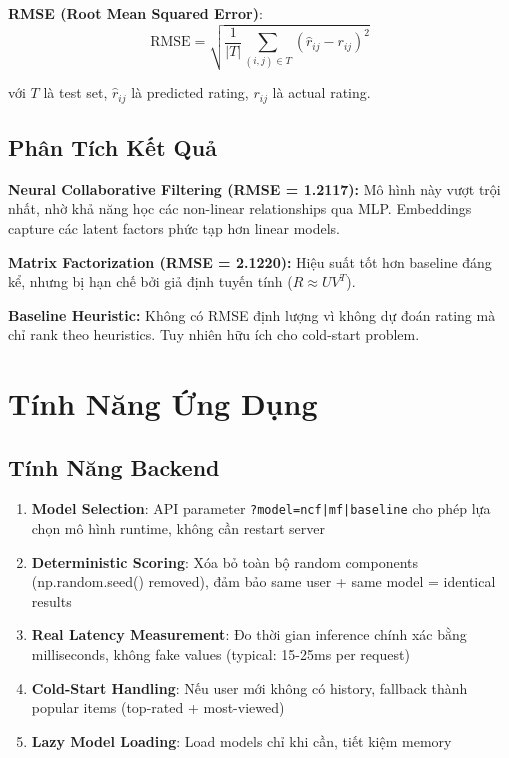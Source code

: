 \documentclass[12pt,a4paper]{article}
\begin{document}
\textbf{RMSE (Root Mean Squared Error)}:
\begin{equation}
\text{RMSE} = \sqrt{\frac{1}{|T|} \sum_{(i,j) \in T} (\hat{r}_{ij} - r_{ij})^2}
\end{equation}

với $T$ là test set, $\hat{r}_{ij}$ là predicted rating, $r_{ij}$ là actual rating.

\subsection{Phân Tích Kết Quả}

\textbf{Neural Collaborative Filtering (RMSE = 1.2117):} Mô hình này vượt trội nhất, nhờ khả năng học các non-linear relationships qua MLP. Embeddings capture các latent factors phức tạp hơn linear models.

\textbf{Matrix Factorization (RMSE = 2.1220):} Hiệu suất tốt hơn baseline đáng kể, nhưng bị hạn chế bởi giả định tuyến tính ($R \approx U V^T$).

\textbf{Baseline Heuristic:} Không có RMSE định lượng vì không dự đoán rating mà chỉ rank theo heuristics. Tuy nhiên hữu ích cho cold-start problem.

\section{Tính Năng Ứng Dụng}

\subsection{Tính Năng Backend}

\begin{enumerate}
    \item \textbf{Model Selection}: API parameter \texttt{?model=ncf|mf|baseline} cho phép lựa chọn mô hình runtime, không cần restart server
    \item \textbf{Deterministic Scoring}: Xóa bỏ toàn bộ random components (np.random.seed() removed), đảm bảo same user + same model = identical results
    \item \textbf{Real Latency Measurement}: Đo thời gian inference chính xác bằng milliseconds, không fake values (typical: 15-25ms per request)
    \item \textbf{Cold-Start Handling}: Nếu user mới không có history, fallback thành popular items (top-rated + most-viewed)
    \item \textbf{Lazy Model Loading}: Load models chỉ khi cần, tiết kiệm memory
\end{enumerate}
\end{document}
